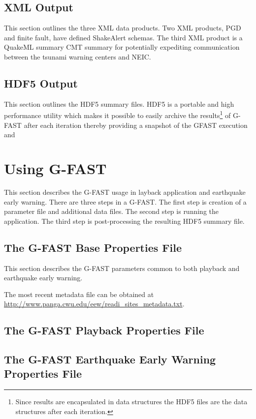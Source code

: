 \documentclass[12pt]{article}
\begin{document}
\clearpage
\subsection{XML Output}
This section outlines the three XML data products.  Two XML products, PGD and finite fault, have
defined ShakeAlert schemas.  The third XML product is a QuakeML summary CMT summary for potentially
expediting communication between the tsunami warning centers and NEIC. 

\clearpage
\subsection{HDF5 Output}
This section outlines the HDF5 summary files.  HDF5 is a portable and high performance 
utility which makes it possible to easily archive the results\footnote{Since results are 
encapsulated in data structures the HDF5 files are the data structures after each iteration.}
of G-FAST after each iteration thereby providing a snapshot of the GFAST execution and 

\section{Using G-FAST}
This section describes the G-FAST usage in layback application and earthquake early warning.  
There are three steps in a G-FAST.  The first step is creation of a parameter file and 
additional data files.  The second step is running the application.  The third step is
post-processing the resulting HDF5 summary file.

\subsection{The G-FAST Base Properties File}\label{S:propertiesFile}
This section describes the G-FAST parameters common to both playback and earthquake early warning.

The most recent metadata file can be obtained at 
\url{http://www.panga.cwu.edu/eew/readi_sites_metadata.txt}.  

\subsection{The G-FAST Playback Properties File}

\subsection{The G-FAST Earthquake Early Warning Properties File}
\end{document}
